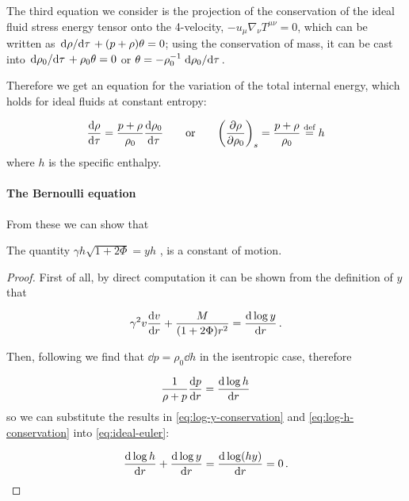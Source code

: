 \documentclass[main.tex]{subfiles}
\begin{document}
The third equation we consider is the projection of the conservation of the ideal fluid stress energy tensor onto the 4-velocity,
\(-u_\mu \nabla_\nu T^{\mu\nu}= 0 \),
which can be written as
\(\dv*{\rho}{\tau} + (p + \rho) \theta = 0 \);
using the conservation of mass, it can be cast into
\(\dv*{\rho_0}{\tau} + \rho_0 \theta = 0 \)
or
\(\theta = - \rho_0^{-1} \dv*{\rho_0}{\tau} \).

Therefore we get an equation for the variation of the total internal energy, which holds for ideal fluids at constant entropy:

\begin{equation} \label{eq:enthalpy-definition}
    \dv{\rho}{\tau} = \frac{p+\rho}{\rho_0} \dv{\rho_0}{\tau}
    \qquad
    \text{or}
    \qquad
    \qty(\pdv{\rho}{\rho_0})_s = \frac{p + \rho}{\rho_0} \defeq h
\end{equation}
%
where $h$ is the specific enthalpy.

\paragraph{The Bernoulli equation}

From these we can show that

\begin{claim}
  The quantity $\gamma h \sqrt{1+2\Phi} = yh$ , is a constant of motion.
\end{claim}

\begin{proof}
First of all, by direct computation it can be shown from the definition of \(y\) that

\begin{equation} \label{eq:log-y-conservation}
  \gamma^2 v \dv{v}{r} + \frac{M}{(1+ 2 \Phi) r^2} = \dv{\log y }{r} \,.
\end{equation}

Then, following \textcite[section 6.3]{Gourgoulhon:2006bn} we find that \(\dd{p} = \rho_0 \dd{h}\) in the isentropic case, therefore

\begin{equation} \label{eq:log-h-conservation}
  \frac{1}{\rho + p} \dv{p}{r}  =  \dv{\log h}{r}
\end{equation}
so we can substitute the results in \eqref{eq:log-y-conservation} and \eqref{eq:log-h-conservation} into \eqref{eq:ideal-euler}:

\begin{equation}
  \dv{\log h}{r} + \dv{\log y }{r} = \dv{\log (hy) }{r} = 0 \,.
\end{equation}
\end{proof}
\end{document}
